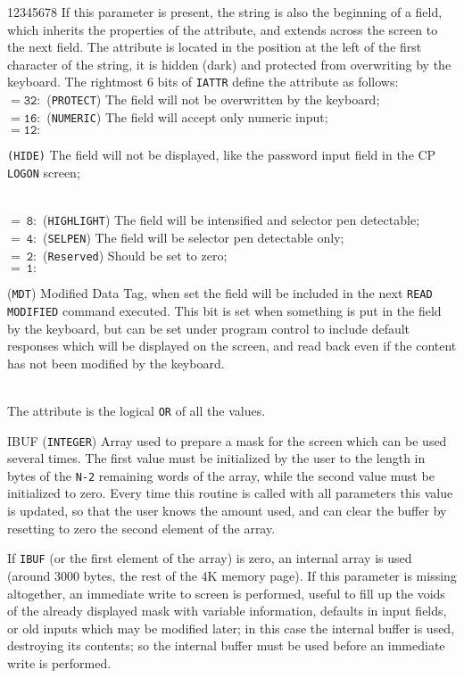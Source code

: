 \begin{DLtt}{12345678}
If this parameter is present, the string is also the beginning of a
field, which inherits the properties of the attribute, and extends
across the screen to the next field.  The attribute is located
in the position at the left of the first character of the string,
it is hidden (dark) and protected from overwriting by the keyboard.
The rightmost 6 bits of {\tt IATTR} define the attribute as follows: \\
$\mathtt{= 32:}$ ({\tt PROTECT}) The field will not be overwritten
by the keyboard; \\
$\mathtt{= 16:}$ ({\tt NUMERIC}) The field will accept only numeric
input; \\
$\mathtt{= 12:}$ \parbox[t]{136mm}
{{\tt (HIDE)} The field will not be displayed,
like the password input field in the CP {\tt LOGON} screen;} \\
$\mathtt{= \ 8:}$ ({\tt HIGHLIGHT}) The field will be intensified and
selector pen detectable;  \\
$\mathtt{= \ 4:}$ ({\tt SELPEN}) The field will be selector pen
detectable only; \\
$\mathtt{= \ 2:}$ ({\tt Reserved}) Should be set to zero;  \\
$\mathtt{= \ 1:}$ \parbox[t]{136mm}
{({\tt MDT}) Modified Data Tag, when set the field will be included in
the next {\tt READ MODIFIED} command executed. This bit
is set when something is put in the field by the keyboard, but can be
set under program control to include default responses which will be
displayed on the screen, and read back even if the content has not been
modified by the keyboard.} \\
The attribute is the logical {\tt OR} of all the values.
\item [IBUF] ({\tt INTEGER}) Array used to prepare a mask for the screen
which can be used several times.  The first value must be initialized
by the user to the length in bytes of the {\tt N-2} remaining words
of the array, while the second value must be initialized to zero.
Every time this routine is called with all parameters this value
is updated, so that the user knows the amount used, and can clear
the buffer by resetting to zero the second element of the array.
\par
If {\tt IBUF} (or the first element of the array) is zero,
an internal array is used (around 3000 bytes, the rest of the 4K
memory page).  If this parameter is missing altogether, an immediate
write to screen is performed, useful to fill up the voids of the
already displayed mask with variable information, defaults
in input fields, or old inputs which may be modified later;
in this case the internal buffer is used, destroying its contents;
so the internal buffer must be used before an immediate write
is performed.
\end{DLtt}
